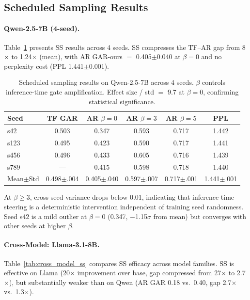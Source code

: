 \documentclass[11pt,a4paper]{article}
\begin{document}
\subsection{Scheduled Sampling Results}

\paragraph{Qwen-2.5-7B (4-seed).}
Table~\ref{tab:ss_seeds} presents SS results across 4 seeds. SS compresses the TF--AR gap from 8$\times$ to 1.24$\times$ (mean), with AR GAR-ours $=$ 0.405$\pm$0.040 at $\beta{=}0$ and no perplexity cost (PPL 1.441$\pm$0.001).

\begin{table}[t]
\centering
\small
\caption{Scheduled sampling results on Qwen-2.5-7B across 4 seeds. $\beta$ controls inference-time gate amplification. Effect size / std $=$ 9.7 at $\beta{=}0$, confirming statistical significance.}
\label{tab:ss_seeds}
\begin{tabular}{@{}lccccc@{}}
\toprule
Seed & TF GAR & AR $\beta{=}0$ & AR $\beta{=}3$ & AR $\beta{=}5$ & PPL \\
\midrule
s42 & 0.503 & 0.347 & 0.593 & 0.717 & 1.442 \\
s123 & 0.495 & 0.423 & 0.590 & 0.717 & 1.441 \\
s456 & 0.496 & 0.433 & 0.605 & 0.716 & 1.439 \\
s789 & --- & 0.415 & 0.598 & 0.718 & 1.440 \\
\midrule
Mean$\pm$Std & 0.498$\pm$.004 & 0.405$\pm$.040 & 0.597$\pm$.007 & 0.717$\pm$.001 & 1.441$\pm$.001 \\
\bottomrule
\end{tabular}
\end{table}

At $\beta{\geq}3$, cross-seed variance drops below 0.01, indicating that inference-time steering is a deterministic intervention independent of training seed randomness. Seed s42 is a mild outlier at $\beta{=}0$ (0.347, $-$1.15$\sigma$ from mean) but converges with other seeds at higher $\beta$.

\paragraph{Cross-Model: Llama-3.1-8B.}
Table~\ref{tab:cross_model_ss} compares SS efficacy across model families. SS is effective on Llama (20$\times$ improvement over base, gap compressed from 27$\times$ to 2.7$\times$), but substantially weaker than on Qwen (AR GAR 0.18 vs.\ 0.40, gap 2.7$\times$ vs.\ 1.3$\times$).
\end{document}
